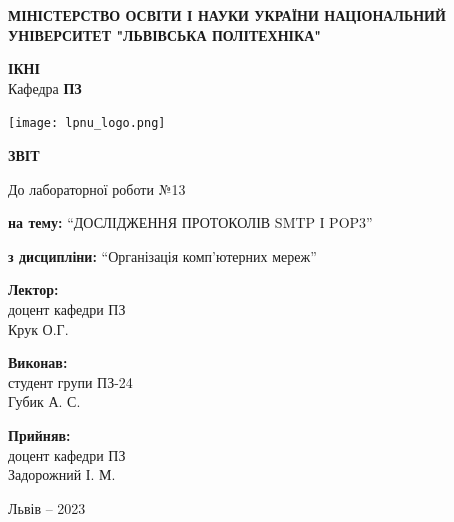 \documentclass[12pt]{extarticle}
\begin{document}
\begin{titlepage}
    \begin{center}
        \textbf{\normalsize{\MakeUppercase{
            Міністерство Освіти і науки України
            Національний університет "Львівська політехніка"
        }}}

        \begin{flushright}
        \textbf{ІКНІ}\\
        Кафедра \textbf{ПЗ}
        \end{flushright}
        \vspace{15mm}

        \texttt{[image: lpnu\_logo.png]}

        \vspace*{\fill}

        \textbf{\normalsize{\MakeUppercase{Звіт}}}
            
        До лабораторної роботи №13

        \textbf{на тему:} “ДОСЛІДЖЕННЯ ПРОТОКОЛІВ
        SMTP І POP3”

        \textbf{з дисципліни:} “Організація комп'ютерних мереж”
            
        \vspace*{\fill}

        \begin{flushright}

            \textbf{Лектор:}\\
            доцент кафедри ПЗ\\
            Крук О.Г.\\
            \vspace{12pt}

            \textbf{Виконав:}\\
            студент групи ПЗ-24\\
            Губик А. С.\\
            \vspace{12pt}

            \textbf{Прийняв:}\\
            доцент кафедри ПЗ\\
            Задорожний І. М.\\
        \vspace{12pt}
        \end{flushright}

        Львів -- 2023
            
            
    \end{center}
\end{titlepage}
\end{document}
